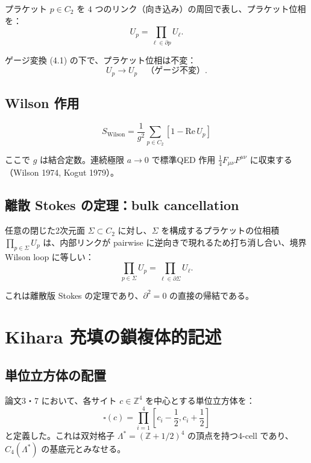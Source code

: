 \documentclass[a4paper,11pt]{ltjsarticle}
\begin{document}
プラケット $p \in C_2$ を $4$ つのリンク（向き込み）の周回で表し、プラケット位相を：
\begin{equation}
U_p = \prod_{\ell \in \partial p} U_\ell. \tag{4.2}
\end{equation}

ゲージ変換 (4.1) の下で、プラケット位相は不変：
\[ U_p \to U_p \quad \text{（ゲージ不変）}. \]

\subsection{Wilson 作用}

\begin{equation}
S_{\text{Wilson}} = \frac{1}{g^2} \sum_{p \in C_2} \left[1 - \text{Re}\, U_p\right] \tag{4.3}
\end{equation}

ここで $g$ は結合定数。連続極限 $a \to 0$ で標準QED 作用 $\frac{1}{4} F_{\mu\nu}F^{\mu\nu}$ に収束する（Wilson 1974, Kogut 1979）。

\subsection{離散 Stokes の定理：bulk cancellation}

任意の閉じた2次元面 $\Sigma \subset C_2$ に対し、$\Sigma$ を構成するプラケットの位相積 $\prod_{p \in \Sigma} U_p$ は、内部リンクが pairwise に逆向きで現れるため打ち消し合い、境界 Wilson loop に等しい：
\begin{equation}
\prod_{p \in \Sigma} U_p = \prod_{\ell \in \partial \Sigma} U_\ell. \tag{4.5}
\end{equation}

これは離散版 Stokes の定理であり、$\partial^2 = 0$ の直接の帰結である。

\section{Kihara 充填の鎖複体的記述}

\subsection{単位立方体の配置}

論文3・7 において、各サイト $c \in \mathbb{Z}^4$ を中心とする単位立方体を：
\begin{equation}
\square(c) = \prod_{i=1}^{4} \left[c_i - \frac{1}{2}, c_i + \frac{1}{2}\right] \tag{5.1}
\end{equation}
と定義した。これは双対格子 $\Lambda^* = (\mathbb{Z} + 1/2)^4$ の頂点を持つ4-cell であり、$C_4(\Lambda^*)$ の基底元とみなせる。
\end{document}
